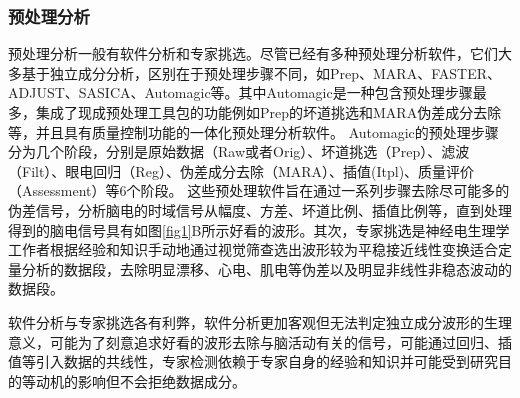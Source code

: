 \subsubsection{预处理分析}
预处理分析一般有软件分析和专家挑选。尽管已经有多种预处理分析软件，它们大多基于独立成分分析，区别在于预处理步骤不同，如Prep、MARA、FASTER、ADJUST、SASICA、Automagic等。其中Automagic是一种包含预处理步骤最多，集成了现成预处理工具包的功能例如Prep的坏道挑选和MARA伪差成分去除等，并且具有质量控制功能的一体化预处理分析软件。 Automagic的预处理步骤分为几个阶段，分别是原始数据（Raw或者Orig）、坏道挑选（Prep）、滤波（Filt）、眼电回归（Reg）、伪差成分去除（MARA）、插值(Itpl)、质量评价（Assessment）等6个阶段。 这些预处理软件旨在通过一系列步骤去除尽可能多的伪差信号，分析脑电的时域信号从幅度、方差、坏道比例、插值比例等，直到处理得到的脑电信号具有如图\ref{fig1}B所示好看的波形。其次，专家挑选是神经电生理学工作者根据经验和知识手动地通过视觉筛查选出波形较为平稳接近线性变换适合定量分析的数据段，去除明显漂移、心电、肌电等伪差以及明显非线性非稳态波动的数据段。

软件分析与专家挑选各有利弊，软件分析更加客观但无法判定独立成分波形的生理意义，可能为了刻意追求好看的波形去除与脑活动有关的信号，可能通过回归、插值等引入数据的共线性，专家检测依赖于专家自身的经验和知识并可能受到研究目的等动机的影响但不会拒绝数据成分。

